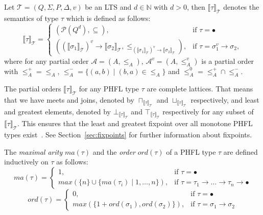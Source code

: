 \begin{definition}
    Let $\mathcal{T} = (Q, \Sigma, P, \Delta, v)$ be an LTS and $d \in \mathbb{N}$ with $d >0$,
    then $\llbracket\tau\rrbracket_\mathcal{T}$ denotes the
    semantics
    of type $\tau$ which is defined as follows:
        \[\llbracket\tau\rrbracket_\mathcal{T}=
        \begin{cases}
            (\mathcal{P}(Q^d), \subseteq),  & \text{if }\tau = \bullet\\
            ((\llbracket\sigma_1\rrbracket_\mathcal{T})^v \rightarrow \llbracket\sigma_2\rrbracket_\mathcal{T}, \leq_{
            (\llbracket\sigma_1\rrbracket_\mathcal{T})^v \rightarrow \llbracket\sigma_2\rrbracket_\mathcal{T}}), &
            \text{if }\tau = \sigma_1^v\rightarrow \sigma_2,
        \end{cases}\]
    where for any partial order $\mathcal{A} = (A, \leq_A)$, $\mathcal{A}^v = (A, \leq_A^v)$ is a partial order
    with $\leq_A^+ = \leq_A$, $\leq_A^- = \{(a, b) \mid (b, a) \in \leq_A\}$ and $\leq_A^0 = \leq_A^+ \cap \leq_A^-$.
\end{definition}

The partial orders $\llbracket\tau\rrbracket_\mathcal{T}$ for any PHFL type $\tau$ are complete lattices. That means that we
have meets and joins, denoted by $\sqcap_{\llbracket\tau\rrbracket_\mathcal{T}}$ and
$\sqcup_{\llbracket\tau\rrbracket_\mathcal{T}}$ respectively, and least and greatest elements, denoted by
$\bot_{\llbracket\tau\rrbracket_\mathcal{T}}$ and $\top_{\llbracket\tau\rrbracket_\mathcal{T}}$ respectively for any subset of
$\llbracket\tau\rrbracket_\mathcal{T}$. This ensures that the least and greatest fixpoint over all monotone PHFL types
exist~\cite{tarski1955lattice}. See Section~\ref{sec:fixpoints} for further information about fixpoints.

\begin{definition}
    The \emph{maximal arity} $ma(\tau)$ and the \emph{order} $ord(\tau)$ of a PHFL type $\tau$ are defined
    inductively on
    $\tau$ as follows:
\[ma(\tau)=
\begin{cases}
    1, & \text{if }\tau = \bullet\\
    max(\{n\} \cup \{ma(\tau_i)\mid1,\dots,n\}), &
    \text{if }\tau = \tau_1\rightarrow\dots\rightarrow\tau_n\rightarrow\bullet
\end{cases}\]
\[ord(\tau)=
\begin{cases}
    0, & \text{if }\tau = \bullet\\
    max(\{1 + ord(\sigma_1), ord(\sigma_2)\}), & \text{if }\tau = \sigma_1 \rightarrow \sigma_2
\end{cases}\]
\end{definition}

